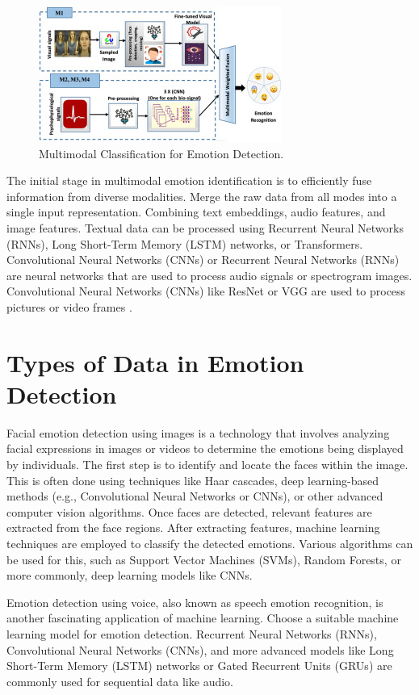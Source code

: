 \documentclass[conference]{IEEEtran}
\begin{document}
\begin{figure}[htbp]
\centerline{\includegraphics{Multimodal.png}}
\caption{Multimodal Classification for Emotion Detection.\cite{KUMAR2022104483}}
\label{fig}
\end{figure}

The initial stage in multimodal emotion identification is to efficiently fuse information from diverse modalities. Merge the raw data from all modes into a single input representation. Combining text embeddings, audio features, and image features. Textual data can be processed using Recurrent Neural Networks (RNNs), Long Short-Term Memory (LSTM) networks, or Transformers. Convolutional Neural Networks (CNNs) or Recurrent Neural Networks (RNNs) are neural networks that are used to process audio signals or spectrogram images. Convolutional Neural Networks (CNNs) like ResNet or VGG are used to process pictures or video frames \cite{huang2019multimodal}.

\section{Types of Data in Emotion Detection}

Facial emotion detection using images is a technology that involves analyzing facial expressions in images or videos to determine the emotions being displayed by individuals. The first step is to identify and locate the faces within the image. This is often done using techniques like Haar cascades, deep learning-based methods (e.g., Convolutional Neural Networks or CNNs), or other advanced computer vision algorithms.  Once faces are detected, relevant features are extracted from the face regions. After extracting features, machine learning techniques are employed to classify the detected emotions. Various algorithms can be used for this, such as Support Vector Machines (SVMs), Random Forests, or more commonly, deep learning models like CNNs.

Emotion detection using voice, also known as speech emotion recognition, is another fascinating application of machine learning. Choose a suitable machine learning model for emotion detection. Recurrent Neural Networks (RNNs), Convolutional Neural Networks (CNNs), and more advanced models like Long Short-Term Memory (LSTM) networks or Gated Recurrent Units (GRUs) are commonly used for sequential data like audio.
\end{document}
